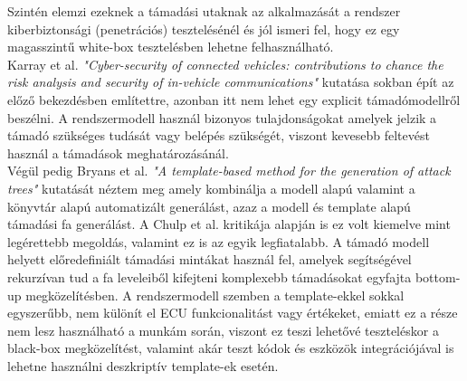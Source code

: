 Szintén elemzi ezeknek a támadási utaknak az alkalmazását a rendszer kiberbiztonsági (penetrációs) tesztelésénél és jól ismeri fel, hogy ez egy magasszintű white-box tesztelésben lehetne felhasználható. \\

Karray et al.\cite{Karray} \textit{"Cyber-security of connected vehicles: contributions to chance the risk analysis and security of in-vehicle communications"} kutatása sokban épít az előző bekezdésben említettre, azonban itt nem lehet egy explicit támadómodellről beszélni. A rendszermodell használ bizonyos tulajdonságokat amelyek jelzik a támadó szükséges tudását vagy belépés szükségét, viszont kevesebb feltevést használ a támadások meghatározásánál.\\

Végül pedig Bryans et al.\cite{Bryans} \textit{"A template-based method for the generation of attack trees"} kutatását néztem meg amely kombinálja a modell alapú valamint a könyvtár alapú automatizált generálást, azaz a modell és template alapú támadási fa generálást. A Chulp et al.\cite{Chulp} kritikája alapján is ez volt kiemelve mint legérettebb megoldás, valamint ez is az egyik legfiatalabb. A támadó modell helyett előredefiniált támadási mintákat használ fel, amelyek segítségével rekurzívan tud a fa leveleiből kifejteni komplexebb támadásokat egyfajta bottom-up megközelítésben. A rendszermodell szemben a template-ekkel sokkal egyszerűbb, nem különít el ECU funkcionalitást vagy értékeket, emiatt ez a része nem lesz használható a munkám során, viszont ez teszi lehetővé teszteléskor a black-box megközelítést, valamint akár teszt kódok és eszközök integrációjával is lehetne használni deszkriptív template-ek esetén. 
